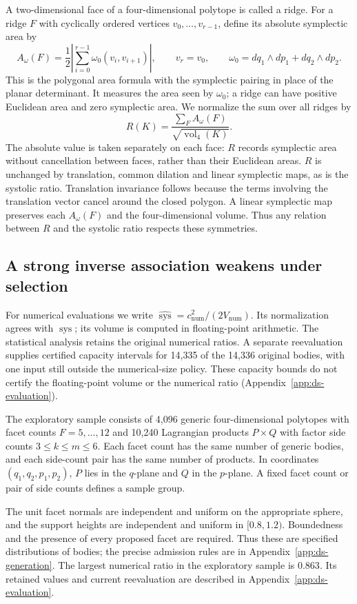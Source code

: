 A two-dimensional face of a four-dimensional polytope is called a ridge.
For a ridge $F$ with cyclically ordered vertices $v_0,\ldots,v_{r-1}$, define
its absolute symplectic area by
\[
 A_\omega(F)=\frac12\left|\sum_{i=0}^{r-1}\omega_0(v_i,v_{i+1})\right|,
 \qquad v_r=v_0,\qquad
 \omega_0=dq_1\wedge dp_1+dq_2\wedge dp_2.
\]
This is the polygonal area formula with the symplectic pairing in place
of the planar determinant. It measures the area seen by $\omega_0$; a
ridge can have positive Euclidean area and zero symplectic area. We
normalize the sum over all ridges by
\[
 R(K)=\frac{\sum_F A_\omega(F)}{\sqrt{\operatorname{vol}_4(K)}}.
\]
The absolute value is taken separately on each face: $R$ records symplectic
area without cancellation between faces, rather than their Euclidean areas.
$R$ is unchanged by translation, common dilation and linear symplectic
maps, as is the systolic ratio.
Translation invariance follows because the terms involving the
translation vector cancel around the closed polygon. A linear symplectic
map preserves each $A_\omega(F)$ and the four-dimensional volume.
Thus any relation between $R$ and the systolic ratio respects these symmetries.

\subsection{A strong inverse association weakens under selection}

For numerical evaluations we write
$\widehat{\operatorname{sys}}=c_{\mathrm{num}}^2/(2V_{\mathrm{num}})$.
Its normalization agrees with $\operatorname{sys}$; its volume is computed
in floating-point arithmetic. The statistical analysis retains the original
numerical ratios. A separate reevaluation supplies certified capacity
intervals for 14,335 of the 14,336 original bodies, with one input still
outside the numerical-size policy. These capacity bounds do not certify
the floating-point volume or the numerical ratio
(Appendix~\ref{app:ds-evaluation}).

The exploratory sample consists of 4,096 generic four-dimensional polytopes
with facet counts $F=5,\ldots,12$ and 10,240 Lagrangian products $P\times Q$
with factor side counts $3\leq k\leq m\leq6$. Each facet count has the
same number of generic bodies, and each side-count pair has the same
number of products. In coordinates $(q_1,q_2,p_1,p_2)$, $P$ lies in the $q$-plane and
$Q$ in the $p$-plane. A fixed facet count or pair of side counts defines a
sample group.

The unit facet normals are independent and uniform on the appropriate
sphere, and the support heights are independent and uniform in
$[0.8,1.2)$. Boundedness and the presence of every proposed facet are
required. Thus these are specified distributions of bodies; the precise
admission rules are in Appendix~\ref{app:ds-generation}. The largest
numerical ratio in the exploratory sample is $0.863$. Its retained values
and current reevaluation are described in Appendix~\ref{app:ds-evaluation}.

